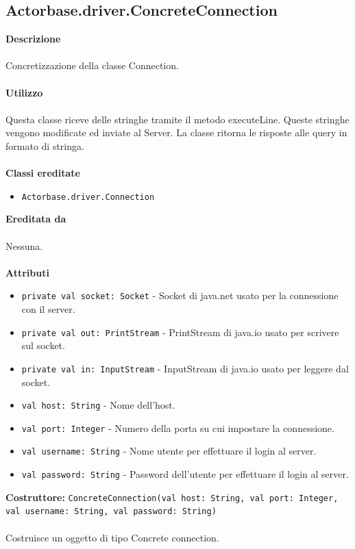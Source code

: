 \documentclass[a4paper]{article}
\begin{document}
			
	\subsection{Actorbase.driver.ConcreteConnection}	
		\textbf{Descrizione}
			\\ \\
			Concretizzazione della classe Connection.
			\\ \\
		\textbf{Utilizzo}
			\\ \\
			Questa classe riceve delle stringhe tramite il metodo executeLine. Queste stringhe vengono modificate ed inviate al Server. La classe ritorna le risposte alle query in formato di stringa.
			\\ \\
		\textbf{Classi ereditate}
			\begin{itemize}
				\item \texttt{Actorbase.driver.Connection}
			\end{itemize}
		\textbf{Ereditata da}
			\\ \\
			Nessuna.
			\\ \\
		\textbf{Attributi}
			\begin{itemize}
				\item \texttt{private val socket: Socket} - Socket di java.net usato per la connessione con il server.
				\item \texttt{private val out: PrintStream} - PrintStream di java.io usato per scrivere sul socket.
				\item \texttt{private val in: InputStream} - InputStream di java.io usato per leggere dal socket.
				\item \texttt{val host: String} - Nome dell'host.
				\item \texttt{val port: Integer} - Numero della porta su cui impostare la connessione.
				\item \texttt{val username: String} - Nome utente per effettuare il login al server.
				\item \texttt{val password: String} - Password dell'utente per effettuare il login al server.
			\end{itemize}
			\textbf{Costruttore: }\texttt{ConcreteConnection(val host: String, val port: Integer, val username: String, val password: String)}
			\\ \\
			Costruisce un oggetto di tipo Concrete connection.
\end{document}
